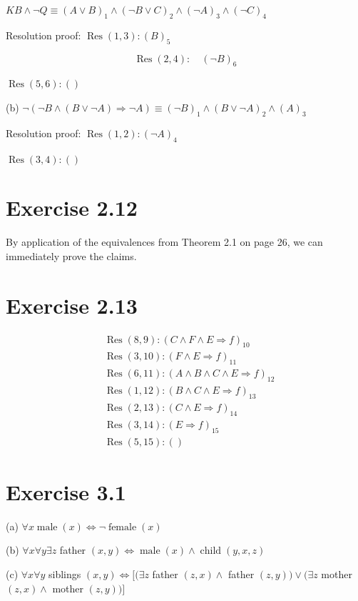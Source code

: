 \documentclass[10pt]{book}
\begin{document}
$K B \wedge \neg Q \equiv(A \vee B)_{1} \wedge(\neg B \vee C)_{2} \wedge(\neg A)_{3} \wedge(\neg C)_{4}$

Resolution proof: $\operatorname{Res}(1,3):(B)_{5}$

$$
\operatorname{Res}(2,4): \quad(\neg B)_{6}
$$

$\operatorname{Res}(5,6):()$

(b) $\neg(\neg B \wedge(B \vee \neg A) \Rightarrow \neg A) \equiv(\neg B)_{1} \wedge(B \vee \neg A)_{2} \wedge(A)_{3}$

Resolution proof: $\operatorname{Res}(1,2):(\neg A)_{4}$

$\operatorname{Res}(3,4):()$

\section{Exercise 2.12}
By application of the equivalences from Theorem 2.1 on page 26, we can immediately prove the claims.

\section{Exercise 2.13}
$$
\begin{aligned}
& \operatorname{Res}(8,9):(C \wedge F \wedge E \Rightarrow f)_{10} \\
& \operatorname{Res}(3,10):(F \wedge E \Rightarrow f)_{11} \\
& \operatorname{Res}(6,11):(A \wedge B \wedge C \wedge E \Rightarrow f)_{12} \\
& \operatorname{Res}(1,12):(B \wedge C \wedge E \Rightarrow f)_{13} \\
& \operatorname{Res}(2,13):(C \wedge E \Rightarrow f)_{14} \\
& \operatorname{Res}(3,14):(E \Rightarrow f)_{15} \\
& \operatorname{Res}(5,15):()
\end{aligned}
$$

\section{Exercise 3.1}
(a) $\forall x \operatorname{male}(x) \Leftrightarrow \neg \operatorname{female}(x)$

(b) $\forall x \forall y \exists z$ father $(x, y) \Leftrightarrow \operatorname{male}(x) \wedge \operatorname{child}(y, x, z)$

(c) $\forall x \forall y$ siblings $(x, y) \Leftrightarrow[(\exists z$ father $(z, x) \wedge$ father $(z, y)) \vee(\exists z$ mother $(z, x) \wedge$ mother $(z, y))]$
\end{document}
